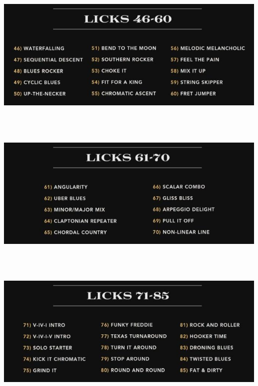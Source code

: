 \documentclass[a4paper]{book}
\begin{document}
\clearpage







\begin{center}
\includegraphics[width=17cm,height=6.881cm]{lebluessupportsmethodes-img19.jpg}
\end{center}


\begin{center}
\includegraphics[width=17cm,height=6.881cm]{lebluessupportsmethodes-img20.jpg}
\end{center}


\begin{center}
\includegraphics[width=17cm,height=6.881cm]{lebluessupportsmethodes-img21.jpg}
\end{center}
\end{document}
